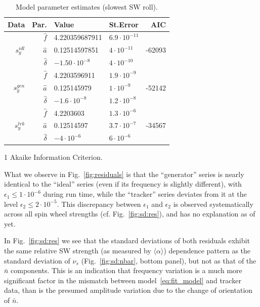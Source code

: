 \documentclass[a4paper]{jacow}
\newcommand{\avg}[1]{\langle {#1} \rangle}
\newcommand{\nbar}{\bar n}
\begin{document}
\begin{table}[h]
  \caption{Model parameter estimates (slowest SW roll).\label{tbl:param_estimates}}
  \begin{threeparttable}
    \begin{tabular}{rrllr}
      \toprule
      Data & Par. & Value & St.Error & AIC\tnote{1} \\
      \midrule
      \multirow{3}{*}{$s_y^{idl}$}
      & $\hat f$ & 4.220359687911 & $6.9\cdot 10^{-11}$ & \multirow{3}{*}{-62093} \\
      & $\hat a$ & 0.12514597851 & $4\cdot 10^{-11}$ & \\
      & $\hat\delta$ & $-1.50\cdot 10^{-8}$ & $4\cdot 10^{-10}$ &\\
      \hline
      \multirow{3}{*}{$s_y^{gen}$}
      & $\hat f$ & 4.2203596911 & $1.9\cdot 10^{-9}$ & \multirow{3}{*}{-52142} \\
      & $\hat a$ & 0.125145979 & $1\cdot 10^{-9}$ & \\
      & $\hat\delta$ & $-1.6\cdot 10^{-8}$ & $1.2\cdot 10^{-8}$ &\\
      \hline
      \multirow{3}{*}{$s_y^{trk}$}
      & $\hat f$ & 4.2203603 & $1.3\cdot 10^{-6}$ & \multirow{3}{*}{-34567} \\
      & $\hat a$ & 0.12514597 & $3.7\cdot 10^{-7}$ & \\
      & $\hat\delta$ & $-4\cdot 10^{-6}$ & $6\cdot 10^{-6}$ &\\
      \bottomrule
    \end{tabular}
    \begin{tablenotes}
      \item[1] Akaike Information Criterion.
    \end{tablenotes}
  \end{threeparttable}
\end{table}

What we observe in Fig.~\ref{fig:residuals} is that the ``generator'' series is nearly identical
to the ``ideal'' series (even if its frequency is slightly different), with $\epsilon_1 \le 1\cdot10^{-6}$
during run time,
while the ``tracker'' series deviates from it at the level
$\epsilon_2 \le 2\cdot 10^{-5}$. This discrepancy between $\epsilon_1$ and $\epsilon_2$ is observed
systematically across all spin wheel strengths (cf. Fig.~\ref{fig:sd:res}), and has no explanation as of yet.

In Fig.~\ref{fig:sd:res} we see that the standard deviations of both residuals exhibit the same
relative SW strength (as measured by $\avg{\alpha}$) dependence pattern as
the standard deviation of $\nu_s$ (Fig.~\ref{fig:sd:nbar}, bottom panel), but not as that of
the $\nbar$ components. This is an indication that frequency variation is a much more significant factor
in the mismatch between model~\eqref{eq:fit_model} and tracker data, than is the presumed amplitude variation
due to the change of orientation of $\nbar$.
\end{document}
